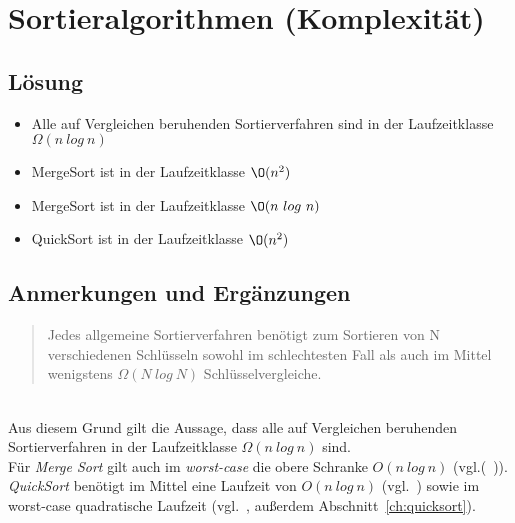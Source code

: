 \chapter{Sortieralgorithmen (Komplexität)}

\section*{Lösung}

\begin{itemize}
    \item Alle auf Vergleichen beruhenden Sortierverfahren sind in der Laufzeitklasse $\Omega(n\ log\ n)$
    \item MergeSort ist in der Laufzeitklasse $\O(n^2)$
    \item MergeSort ist in der Laufzeitklasse $\O(n\ log\ n)$
    \item QuickSort ist in der Laufzeitklasse $\O(n^2)$
\end{itemize}


\section*{Anmerkungen und Ergänzungen}

\blockquote[{\cite[154, Satz 2.4]{OW17b}}]{
    Jedes allgemeine Sortierverfahren benötigt zum Sortieren von N verschiedenen Schlüsseln sowohl im schlechtesten Fall als auch im Mittel wenigstens $\Omega(N\ log\ N)$
    Schlüsselvergleiche.
}\\

Aus diesem Grund gilt die Aussage, dass alle auf Vergleichen beruhenden Sortierverfahren in der Laufzeitklasse $\Omega(n\ log\ n)$ sind.\\

Für \textit{Merge Sort} gilt auch im \textit{worst-case} die obere Schranke $O(n\ log\ n)$ (vgl.(~\cite[116]{OW17b})).\\

\textit{QuickSort} benötigt im Mittel eine Laufzeit von $O(n\ log\ n)$ (vgl.~\cite[99]{OW17b}) sowie im worst-case quadratische Laufzeit (vgl.~\cite[96]{OW17b}, außerdem Abschnitt~\ref{ch:quicksort}).